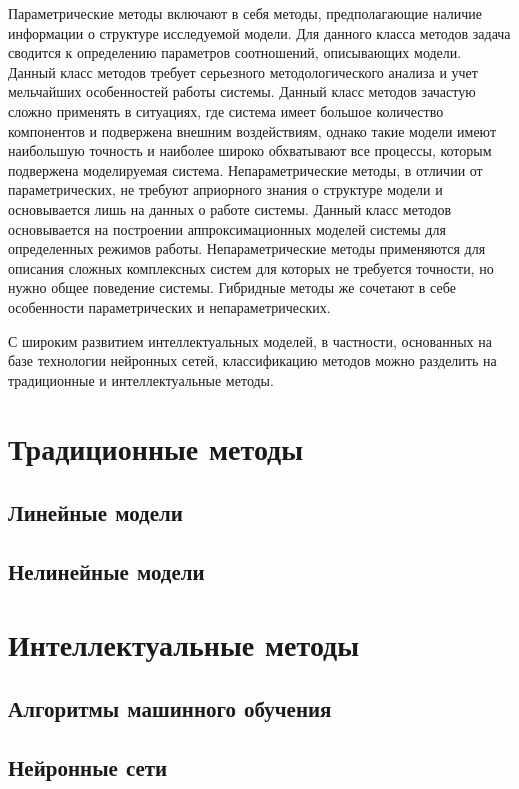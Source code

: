 Параметрические методы включают в себя методы, предполагающие наличие
информации о структуре исследуемой модели. Для данного класса методов задача
сводится к определению параметров соотношений, описывающих модели. Данный класс
методов требует серьезного методологического анализа и учет мельчайших
особенностей работы системы. Данный класс методов зачастую сложно применять в
ситуациях, где система имеет большое количество компонентов и подвержена
внешним воздействиям, однако такие модели имеют наибольшую точность и наиболее
широко обхватывают все процессы, которым подвержена моделируемая система.
Непараметрические методы, в отличии от параметрических,
не требуют априорного знания о структуре модели и основывается лишь на данных о
работе системы. Данный класс методов основывается на построении
аппроксимационных моделей системы для определенных режимов работы.
Непараметрические методы применяются для описания сложных комплексных систем
для которых не требуется точности, но нужно общее поведение системы. Гибридные
методы же сочетают в себе особенности параметрических и непараметрических. 

С широким развитием интеллектуальных моделей, в частности, основанных на базе технологии нейронных сетей, классификацию методов можно разделить на традиционные и интеллектуальные методы.

\section{Традиционные методы}

\subsection{Линейные модели}

\subsection{Нелинейные модели}

\section{Интеллектуальные методы}

\subsection{Алгоритмы машинного обучения}

\subsection{Нейронные сети}

